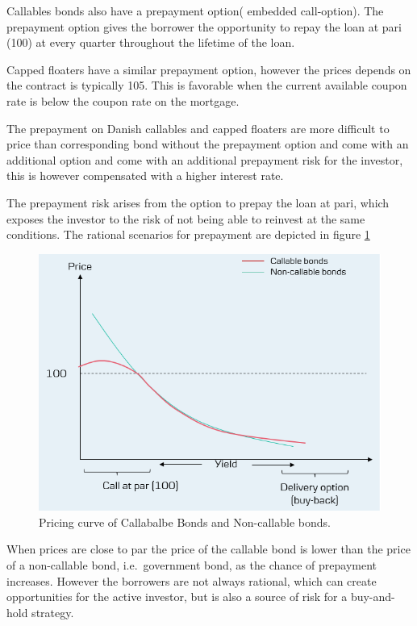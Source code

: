 \documentclass[12pt,twoside]{reedthesis}
\begin{document}
Callables bonds also have a prepayment option( embedded call-option). The prepayment option gives the borrower the opportunity to repay the loan at pari (100) at every quarter throughout the lifetime of the loan.

Capped floaters have a similar prepayment option, however the prices depends on the contract is typically 105. This is favorable when the current available coupon rate is below the coupon rate on the mortgage.

The prepayment on Danish callables and capped floaters are more difficult to price than corresponding bond without the prepayment option and come with an additional option and come with an additional prepayment risk for the investor, this is however compensated with a higher interest rate.

The prepayment risk arises from the option to prepay the loan at pari, which exposes the investor to the risk of not being able to reinvest at the same conditions. The rational scenarios for prepayment are depicted in figure \ref{fig:prepayment}
\begin{figure}

{\centering \includegraphics[width=1\linewidth]{figure/prepay} 

}

\caption{Pricing curve of Callabalbe Bonds and Non-callable bonds.}\label{fig:prepayment}
\end{figure}
When prices are close to par the price of the callable bond is lower than the price of a non-callable bond, i.e.~government bond, as the chance of prepayment increases. However the borrowers are not always rational, which can create opportunities for the active investor, but is also a source of risk for a buy-and-hold strategy.
\end{document}
